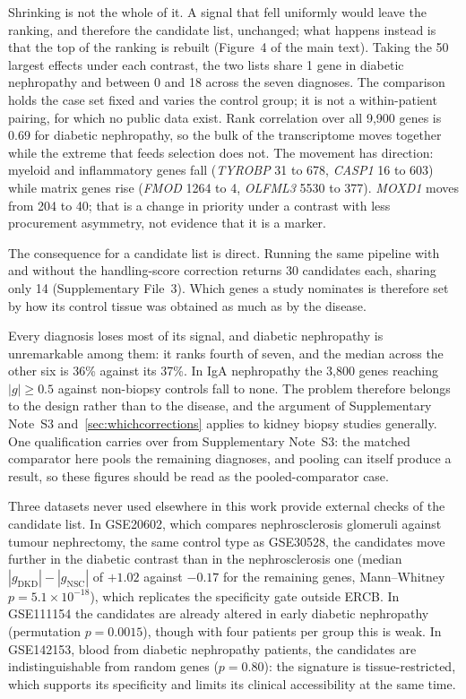 \documentclass[11pt]{article}
\begin{document}
Shrinking is not the whole of it. A signal that fell uniformly would leave the ranking, and
therefore the candidate list, unchanged; what happens instead is that the top of the ranking is
rebuilt (Figure~4 of the main text). Taking the 50 largest effects under each contrast, the two
lists share 1 gene in diabetic nephropathy and between 0 and 18 across the seven
diagnoses. The comparison holds the case set fixed and varies the control group; it is not
a within-patient pairing, for which no public data exist. Rank correlation over all 9,900 genes is 0.69 for diabetic
nephropathy, so the bulk of the transcriptome moves together while the extreme that feeds
selection does not. The movement has direction: myeloid and inflammatory genes fall (\textit{TYROBP}
31 to 678, \textit{CASP1} 16 to 603) while matrix genes rise (\textit{FMOD} 1264 to 4,
\textit{OLFML3} 5530 to 377). \textit{MOXD1} moves from 204 to 40; that is a change in
priority under a contrast with less procurement asymmetry, not evidence that it is a marker.




The consequence for a candidate list is direct. Running the same pipeline with and without
the handling-score correction returns 30 candidates each, sharing only 14
(Supplementary File~3). Which genes a study nominates is therefore set by how its control
tissue was obtained as much as by the disease.

Every diagnosis loses most of its signal, and diabetic nephropathy is unremarkable among them:
it ranks fourth of seven, and the median across the other six is 36\% against its 37\%. In IgA
nephropathy the 3,800 genes reaching $|g| \ge 0.5$ against non-biopsy controls fall to none.
The problem therefore belongs to the design rather than to the disease, and the argument of
Supplementary Note~S3 and~\ref{sec:whichcorrections} applies to kidney biopsy studies
generally. One qualification carries over from Supplementary Note~S3: the matched
comparator here pools the remaining diagnoses, and pooling can itself produce a result, so these
figures should be read as the pooled-comparator case.

Three datasets never used elsewhere in this work provide external checks of the candidate list.
In GSE20602, which compares nephrosclerosis glomeruli against tumour nephrectomy, the same
control type as GSE30528, the candidates move further in the diabetic contrast than in the
nephrosclerosis one (median $|g_{\text{DKD}}| - |g_{\text{NSC}}|$ of $+1.02$ against $-0.17$ for
the remaining genes, Mann--Whitney $p = 5.1 \times 10^{-18}$), which replicates the specificity
gate outside ERCB. In GSE111154 the candidates are already altered in early diabetic nephropathy
(permutation $p = 0.0015$), though with four patients per group this is weak. In GSE142153, blood
from diabetic nephropathy patients, the candidates are indistinguishable from random genes
($p = 0.80$): the signature is tissue-restricted, which supports its specificity and limits its
clinical accessibility at the same time.
\end{document}
